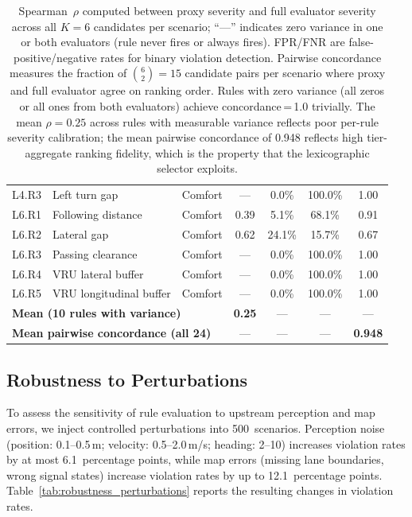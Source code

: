 \begin{table}
\begin{tabular}{llccccc}
L4.R3  & Left turn gap             & Comfort & ---     &  0.0\% &100.0\% & 1.00 \\
L6.R1  & Following distance        & Comfort &   0.39 &  5.1\% & 68.1\% & 0.91 \\
L6.R2  & Lateral gap               & Comfort &   0.62 & 24.1\% & 15.7\% & 0.67 \\
L6.R3  & Passing clearance         & Comfort & ---     &  0.0\% &100.0\% & 1.00 \\
L6.R4  & VRU lateral buffer        & Comfort & ---     &  0.0\% &100.0\% & 1.00 \\
L6.R5  & VRU longitudinal buffer   & Comfort & ---     &  0.0\% &100.0\% & 1.00 \\
\midrule
\multicolumn{3}{l}{\textbf{Mean (10 rules with variance)}} &  \textbf{0.25} & --- & --- & --- \\
\multicolumn{3}{l}{\textbf{Mean pairwise concordance (all 24)}} & --- & --- & --- & \textbf{0.948} \\
\bottomrule
\end{tabular}
\vspace{1mm}
\caption*{\footnotesize Spearman~$\rho$ computed between proxy severity and full evaluator severity across all $K{=}6$ candidates per scenario; ``---'' indicates zero variance in one or both evaluators (rule never fires or always fires).  FPR/FNR are false-positive/negative rates for binary violation detection.  Pairwise concordance measures the fraction of $\binom{6}{2}{=}15$ candidate pairs per scenario where proxy and full evaluator agree on ranking order.  Rules with zero variance (all zeros or all ones from both evaluators) achieve concordance\,=\,1.0 trivially.  The mean $\rho{=}0.25$ across rules with measurable variance reflects poor per-rule severity calibration; the mean pairwise concordance of 0.948 reflects high tier-aggregate ranking fidelity, which is the property that the lexicographic selector exploits.}
\end{table}

\subsection{Robustness to Perturbations}
\label{subsec:robustness}

To assess the sensitivity of rule evaluation to upstream perception and map errors, we inject controlled perturbations into 500~scenarios. Perception noise (position: 0.1--0.5\,m; velocity: 0.5--2.0\,m/s; heading: 2--10\textdegree) increases violation rates by at most 6.1~percentage points, while map errors (missing lane boundaries, wrong signal states) increase violation rates by up to 12.1~percentage points. Table~\ref{tab:robustness_perturbations} reports the resulting changes in violation rates.

